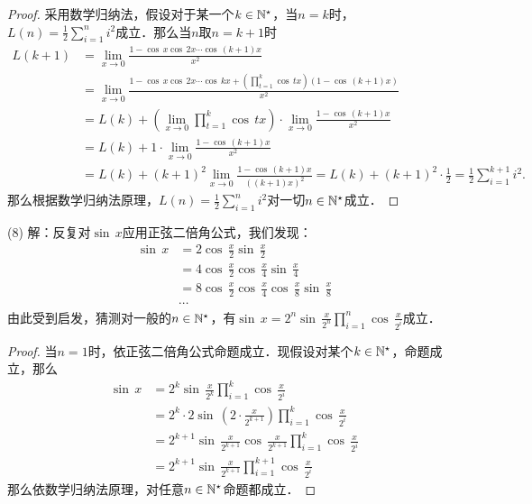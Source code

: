 \begin{proof}
采用数学归纳法，假设对于某一个$k \in \mathbb{N}^\star$，当$n=k$时，$L(n) = \displaystyle\frac{1}{2} \sum_{i=1}^n i^2$成立．那么当$n$取$n=k+1$时
\begin{align}
    L(k+1) &= \lim_{x \to 0} \frac{1-\cos \, x \cos \, 2x \cdots \cos \, (k+1)x}{x^2} \\
    &= \lim_{x \to 0} \frac{1-\cos \, x \cos \, 2x \cdots \cos \, kx + \left(\displaystyle\prod_{t=1}^{k} \cos \, tx \right)\left(1-\cos \, (k+1)x\right)}{x^2} \\
    &= L(k) + \left(\lim_{x \to 0} \displaystyle\prod_{t=1}^{k} \cos \, tx \right) \cdot \lim_{x \to 0} \frac{1-\cos \, (k+1)x}{x^2} \\
    &= L(k) + 1 \cdot \lim_{x \to 0} \frac{1-\cos \, (k+1)x}{x^2} \\
    &= L(k) + (k+1)^2 \lim_{x \to 0} \frac{1-\cos \, (k+1)x}{((k+1)x)^2} = L(k) + (k+1)^2 \cdot \frac{1}{2} = \frac{1}{2} \sum_{i=1}^{k+1} i^2.
\end{align}
那么根据数学归纳法原理，$L(n) = \displaystyle\frac{1}{2}\displaystyle\sum_{i=1}^n i^2$对一切$n \in \mathbb{N}^\star$成立．
\end{proof}

\noindent (8) 解：反复对$\sin \, x$应用正弦二倍角公式，我们发现：
\begin{align}
    \sin \, x & = 2 \cos \, \frac{x}{2} \sin \, \frac{x}{2} \\
    &= 4 \cos \, \frac{x}{2} \cos \, \frac{x}{4} \sin \, \frac{x}{4} \\
    &= 8 \cos \, \frac{x}{2} \cos \, \frac{x}{4} \cos \, \frac{x}{8} \sin \, \frac{x}{8} \\
    &\cdots
\end{align}
由此受到启发，猜测对一般的$n \in \mathbb{N}^\star$，有$\sin \, x = 2^n \sin \, \displaystyle\frac{x}{2^n} \displaystyle\prod_{i=1}^n \cos \, \displaystyle\frac{x}{2^i}$成立．
\begin{proof}
当$n=1$时，依正弦二倍角公式命题成立．现假设对某个$k \in \mathbb{N}^\star$，命题成立，那么
\begin{align}
    \sin \, x &= 2^{k} \sin \, \displaystyle\frac{x}{2^k} \prod_{i=1}^k \cos \, \frac{x}{2^i} \\
    &= 2^{k} \cdot 2 \sin \, \left( 2 \cdot \frac{x}{2^{k+1}} \right) \prod_{i=1}^k \cos \, \frac{x}{2^i} \\
    &= 2^{k+1} \sin \, \frac{x}{2^{k+1}} \cos \, \frac{x}{2^{k+1}} \prod_{i=1}^{k} \cos \, \frac{x}{2^i} \\
    &= 2^{k+1} \sin \, \frac{x}{2^{k+1}} \prod_{i=1}^{k+1} \cos \, \frac{x}{2^{i}}
\end{align}
那么依数学归纳法原理，对任意$n \in \mathbb{N}^\star$命题都成立．
\end{proof}

